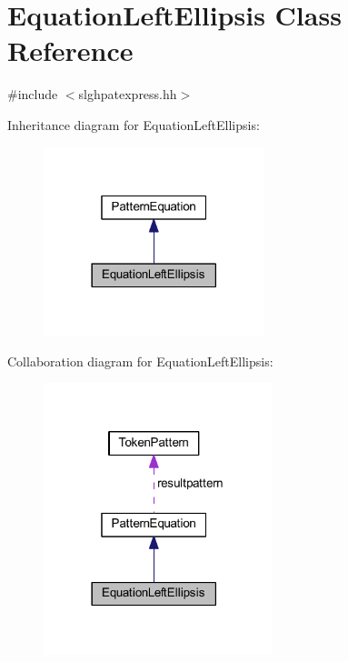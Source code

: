 \hypertarget{class_equation_left_ellipsis}{}\section{Equation\+Left\+Ellipsis Class Reference}
\label{class_equation_left_ellipsis}


{\ttfamily \#include $<$slghpatexpress.\+hh$>$}



Inheritance diagram for Equation\+Left\+Ellipsis\+:
\nopagebreak
\begin{figure}[H]
\begin{center}
\leavevmode
\includegraphics[width=182pt]{class_equation_left_ellipsis__inherit__graph}
\end{center}
\end{figure}


Collaboration diagram for Equation\+Left\+Ellipsis\+:
\nopagebreak
\begin{figure}[H]
\begin{center}
\leavevmode
\includegraphics[width=189pt]{class_equation_left_ellipsis__coll__graph}
\end{center}
\end{figure}
